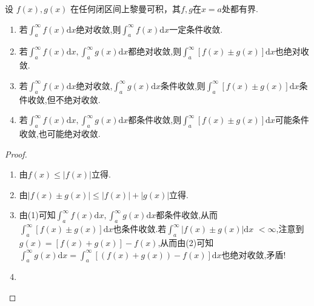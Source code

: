 \documentclass[../../main.tex]{subfiles}%
\begin{document}
\begin{proposition}\label{proposition:反常积分敛散性运算性质}
设 \(f(x),g(x)\) 在任何闭区间上黎曼可积，其$f,g$在$x=a$处都有界.
\begin{enumerate}[(1)]
\item 若$\int_a^{\infty}{f\left( x \right) \mathrm{d}x}$绝对收敛,则$\int_a^{\infty}{f\left( x \right) \mathrm{d}x}$一定条件收敛.

\item 若$\int_a^{\infty}{f\left( x \right) \mathrm{d}x},
\int_a^{\infty}{g\left( x \right) \mathrm{d}x}$都绝对收敛,则$\int_a^{\infty}{\left[ f\left( x \right) \pm g\left( x \right) \right] \mathrm{d}x}$也绝对收敛.

\item 若$\int_a^{\infty}{f\left( x \right) \mathrm{d}x}$绝对收敛,$
\int_a^{\infty}{g\left( x \right) \mathrm{d}x}$条件收敛,则$\int_a^{\infty}{\left[ f\left( x \right) \pm g\left( x \right) \right] \mathrm{d}x}$条件收敛,但不绝对收敛.

\item 若$\int_a^{\infty}{f\left( x \right) \mathrm{d}x},
\int_a^{\infty}{g\left( x \right) \mathrm{d}x}$都条件收敛,则$\int_a^{\infty}{\left[ f\left( x \right) \pm g\left( x \right) \right] \mathrm{d}x}$可能条件收敛,也可能绝对收敛.
\end{enumerate}
\end{proposition}
\begin{proof}
\begin{enumerate}[(1)]
\item 由$f(x)\leqslant  |f(x)|$立得.

\item 由$|f(x)\pm g(x)|\leqslant  |f(x)|+|g(x)|$立得.

\item 由(1)可知$\int_a^{\infty}{f\left( x \right) \mathrm{d}x},
\int_a^{\infty}{g\left( x \right) \mathrm{d}x}$都条件收敛,从而$\int_a^{\infty}{\left[ f\left( x \right) \pm g\left( x \right) \right] \mathrm{d}x}$也条件收敛.若$\int_a^{\infty}{\left| f\left( x \right) \pm g\left( x \right) \right|\mathrm{d}x}$ $<\infty$,注意到$g\left( x \right) =\left[ f\left( x \right) +g\left( x \right) \right] -f\left( x \right)$,从而由(2)可知$\int_a^{\infty}{g\left( x \right) \mathrm{d}x}=\int_a^{\infty}{\left[ \left( f\left( x \right) +g\left( x \right) \right) -f\left( x \right) \right] \mathrm{d}x}$也绝对收敛,矛盾!

\item 
\end{enumerate}

\end{proof}
\end{document}
